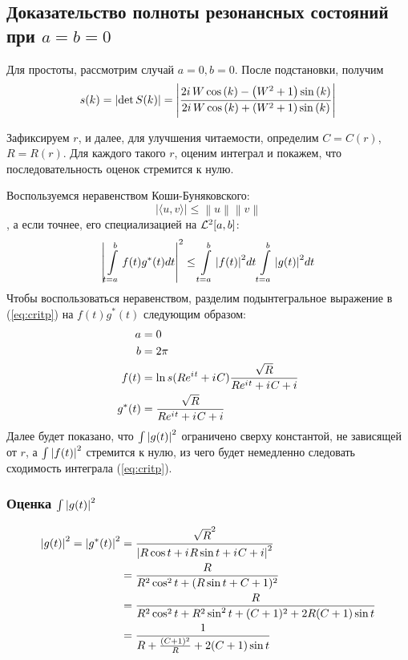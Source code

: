 \subsection{Доказательство полноты резонансных состояний при $a = b = 0$}
Для простоты, рассмотрим случай $a = 0, b = 0$. После подстановки, получим
\begin{equation}\label{eq:bundle_s}
s(k) = \abs{\det S(k)} = \abs{\frac{2 i \, W \cos\left(k\right) - {\left(W^{2} + 1\right)} \sin\left(k\right)}{2 i \, W \cos\left(k\right) + {\left(W^{2} + 1\right)} \sin\left(k\right)}}
\end{equation}


Зафиксируем $r$, и далее, для улучшения читаемости, определим $C = C(r)$, $R = R(r)$. Для каждого такого $r$, оценим интеграл и покажем, что последовательность оценок стремится к нулю.

Воспользуемся неравенством Коши-Буняковского:
\[
\big| \langle u,v \rangle \big| \leq \left\|u\right\| \left\|v\right\|
\]
, а если точнее, его специализацией на $\mathcal{L}^2[a, b]$:
\[
\abs{
\int\limits_{t=a}^{b} f(t) g^*(t) dt
}^2
\le
\int\limits_{t=a}^b \abs{f(t)}^2 dt 
\int\limits_{t=a}^b \abs{g(t)}^2 dt 
\]
% 
Чтобы воспользоваться неравенством, разделим подынтегральное выражение в (\ref{eq:critp}) на $f(t) g^*(t)$ следующим образом:
\begin{equation*}
\begin{aligned}
a      &= 0 \\
b      &= 2 \pi \\
f(t)   &= \ln s(R e^{{i\mkern1mu} t} + {i\mkern1mu} C) \frac{\sqrt{R}}{R e^{{i\mkern1mu} t} + {i\mkern1mu} C + i} \\
g^*(t) &= \frac{\sqrt{R}}{R e^{{i\mkern1mu} t} + {i\mkern1mu} C + i}
\end{aligned}
\end{equation*}
Далее будет показано, что $\int \abs{g(t)}^2$ ограничено сверху константой, не зависящей от $r$, а $\int \abs{f(t)}^2$ стремится к нулю, из чего будет немедленно следовать сходимость интеграла (\ref{eq:critp}).

\subsubsection{Оценка $\int \abs{g(t)}^2$}

\begin{align*}
\abs{g(t)}^2 = \abs{g^*(t)}^2
&=   \frac{\sqrt{R}^2}{\abs{R \cos t + {i\mkern1mu} R \sin t + {i\mkern1mu} C + i}^2} \\
&=   \frac{R}{R^2 \cos^2 t + (R \sin t + C + 1)^2} \\
&= \frac{R}{R^2 \cos^2 t + R^2 \sin^2 t + (C + 1)^2  + 2 R (C + 1) \sin t} \\
&=   \frac{1}{R + \frac{(C + 1)^2}{R} + 2 (C + 1) \sin t} \\ 
\end{align*}

